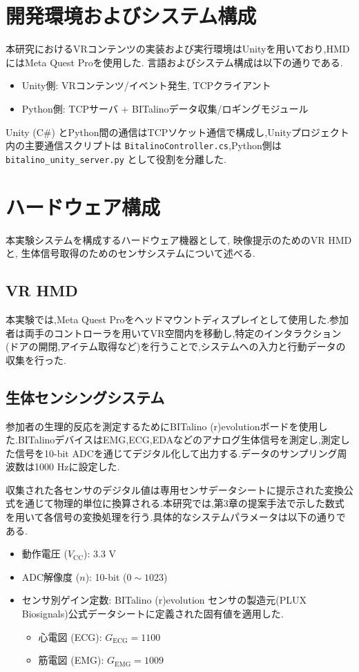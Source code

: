 \documentclass[book,paper=a4,fontsize=10pt,jafontscale=0.92]{jlreq}
\begin{document}
\section{開発環境およびシステム構成}
本研究におけるVRコンテンツの実装および実行環境はUnityを用いており,HMDにはMeta Quest Proを使用した.
言語およびシステム構成は以下の通りである.
\begin{itemize}
\item Unity側: VRコンテンツ/イベント発生, TCPクライアント
\item Python側: TCPサーバ + BITalinoデータ収集/ロギングモジュール
\end{itemize}
Unity (C\#) とPython間の通信はTCPソケット通信で構成し,Unityプロジェクト内の主要通信スクリプトは \texttt{BitalinoController.cs},Python側は \texttt{bitalino\_unity\_server.py} として役割を分離した.


\section{ハードウェア構成}
本実験システムを構成するハードウェア機器として, 映像提示のためのVR HMDと, 生体信号取得のためのセンサシステムについて述べる.

\subsection{VR HMD}
本実験では,Meta Quest Proをヘッドマウントディスプレイとして使用した.参加者は両手のコントローラを用いてVR空間内を移動し,特定のインタラクション(ドアの開閉,アイテム取得など)を行うことで,システムへの入力と行動データの収集を行った.

\subsection{生体センシングシステム}
参加者の生理的反応を測定するためにBITalino (r)evolutionボードを使用した.BITalinoデバイスはEMG,ECG,EDAなどのアナログ生体信号を測定し,測定した信号を10-bit ADCを通じてデジタル化して出力する.データのサンプリング周波数は1000 Hzに設定した.

収集された各センサのデジタル値は専用センサデータシートに提示された変換公式を通じて物理的単位に換算される.本研究では,第3章の提案手法で示した数式を用いて各信号の変換処理を行う.具体的なシステムパラメータは以下の通りである.
\begin{itemize}
\item 動作電圧 ($V_{\mathrm{CC}}$): 3.3 V
\item ADC解像度 ($n$): 10-bit ($0 \sim 1023$)
\item センサ別ゲイン定数: BITalino (r)evolution センサの製造元(PLUX Biosignals)公式データシートに定義された固有値を適用した.
  \begin{itemize}
  \item 心電図 (ECG): $G_\mathrm{ECG} = 1100$
  \item 筋電図 (EMG): $G_\mathrm{EMG} = 1009$
  \end{itemize}
\end{itemize}
\end{document}
